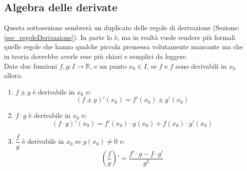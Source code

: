 \subsection{Algebra delle derivate} 
Questa sottosezione sembrerà un duplicato delle regole di derivazione (Sezione: 
\ref{sec_regoleDerivazione}). In parte lo è, ma in realtà vuole rendere più 
formali quelle regole che hanno qualche piccola premessa volutamente mancante 
ma che in teoria dovrebbe averle rese più chiari e semplici da leggere.\\

Date due funzioni $f, g: I \to \mathbb{R}$, e un punto $x_0 \in I$, se $f$ e 
$f$ sono derivabili in $x_0$ allora:
\begin{enumerate}
	\item $f \pm g$ è derivabile in $x_0$ e: 
		\begin{equation*}
			(f \pm g)' (x_0) = f'(x_0) \pm g'(x_0)
		\end{equation*}

	\item $f \cdot g$ è derivabile in $x_0$ e: 
		\begin{equation*}
			(f \cdot g)' (x_0) = f'(x_0) \cdot g(x_0) + f(x_0) \cdot g'(x_0)
		\end{equation*}

	\item $\dfrac{f}{g}$ è derivabile in $x_0$ se $g(x_0) \neq 0$ e: 
		\begin{equation*}
			\left( \dfrac{f}{g} \right)' = \dfrac{f' \cdot g - f \cdot g'}{g^2}
		\end{equation*}
\end{enumerate}

